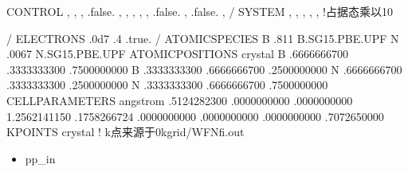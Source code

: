 \documentclass[a4paper,12pt,english]{sphinxmanual}
\begin{document}
\begin{sphinxVerbatim}[commandchars=\\\{\}]
 CONTROL
                          ,
                    ,
                   ,
                    .false. ,
                         ,
                         ,
                     ,
                         ,
                       .false. ,
                       .false. ,
 /
 SYSTEM
                         ,
                           ,
                          ,
                        ,
                         ,        !占据态乘以10


 /
 ELECTRONS
              
              .0d\PYGZhy{}7
              
              .4
           
            
            .true.
/
ATOMIC\PYGZus{}SPECIES
B      .811 B.SG15.PBE.UPF
N      .0067 N.SG15.PBE.UPF
ATOMIC\PYGZus{}POSITIONS crystal
B            .6666666700       .3333333300       .7500000000
B            .3333333300       .6666666700       .2500000000
N            .6666666700       .3333333300       .2500000000
N            .3333333300       .6666666700       .7500000000
CELL\PYGZus{}PARAMETERS angstrom
      .5124282300       .0000000000       .0000000000
     \PYGZhy{}1.2562141150       .1758266724       .0000000000
      .0000000000       .0000000000       .7072650000
K\PYGZus{}POINTS crystal  ! k点来源于0\PYGZhy{}kgrid/WFN\PYGZus{}fi.out
\end{sphinxVerbatim}
\begin{itemize}
\item {} 
\sphinxAtStartPar
pp\_in

\end{itemize}
\end{document}
